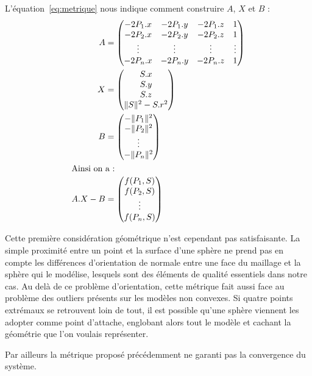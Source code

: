 \documentclass[10pt,a4paper,twoside, twocolumn]{report}
\begin{document}
L'équation~\ref{eq:metrique} nous indique comment construire $A$, $X$ et $B$ :
\begin{subequations}
\begin{align}
		A	&=	\begin{pmatrix}
						-2P_1.x & -2P_1.y & -2P_1.z & 1 			\\
						-2P_2.x & -2P_2.y & -2P_2.z & 1 			\\
						\vdots	& \vdots	&	\vdots	& \vdots	\\
						-2P_n.x & -2P_n.y & -2P_n.z & 1
					\end{pmatrix}																												\\
		X &=	\begin{pmatrix} S.x \\ S.y \\ S.z \\ \|S\|^2 - S.r^2 \end{pmatrix}	\\
		B	&=	\begin{pmatrix}
						-\|P_1\|^2	\\
						-\|P_2\|^2	\\
						\vdots			\\
						-\|P_n\|^2
					\end{pmatrix}																												\\
\intertext{Ainsi on a :}
	A.X-B &= \begin{pmatrix}
						f(P_1, S)	\\
						f(P_2, S)	\\
						\vdots		\\
						f(P_n, S)
					\end{pmatrix}
\end{align}
\end{subequations}

Cette première considération géométrique n'est cependant pas satisfaisante. La simple proximité entre un point et la surface d'une sphère ne prend pas en compte les différences d'orientation de normale entre une face du maillage et la sphère qui le modélise, lesquels sont des éléments de qualité essentiels dans notre cas. Au delà de ce problème d'orientation, cette métrique fait aussi face au problème des outliers présents sur les modèles non convexes. Si quatre points extrémaux se retrouvent loin de tout, il est possible qu'une sphère viennent les adopter comme point d'attache, englobant alors tout le modèle et cachant la géométrie que l'on voulais représenter.

Par ailleurs la métrique proposé précédemment ne garanti pas la convergence du système.
\end{document}
